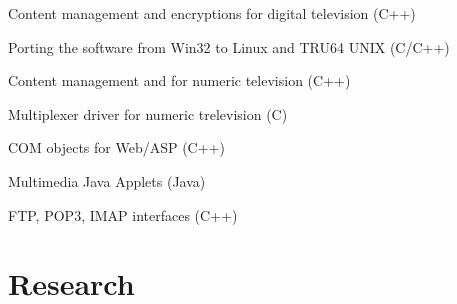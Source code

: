 \documentclass[a4paper]{deedy-resume} %
\begin{document}
\begin{minipage}[t]{0.66\textwidth}
\sectionspace %



\begin{tightitemize}
\item Content management and encryptions for digital television (C++)
\item Porting the software from Win32 to Linux and TRU64 UNIX (C/C++)
\end{tightitemize}

\sectionspace %



\begin{tightitemize}
\item Content management and for numeric television (C++)
\item Multiplexer driver for numeric trelevision (C)
\end{tightitemize}

\sectionspace %



\begin{tightitemize}
\item COM objects for Web/ASP (C++)
\item Multimedia Java Applets (Java)
\item FTP, POP3, IMAP interfaces (C++)
\end{tightitemize}

\sectionspace %


\section{Research}



\end{minipage}
\end{document}
